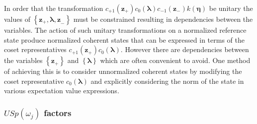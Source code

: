 \documentclass[aps,preprint]{revtex4}%
\begin{document}
In order that the transformation $c_{+1}\left(  \mathbf{z}_{+}\right)
c_{0}\left(  \mathbf{\lambda}\right)  c_{-1}\left(  \mathbf{z}_{-}\right)
k\left(  \mathbf{\eta}\right)  $ be unitary the values of $\left\{
\mathbf{z}_{+},\mathbf{\lambda,z}_{-}\right\}  $ must be constrained resulting
in dependencies between the variables. The action of such unitary
transformations on a normalized reference state produce normalized coherent
states that can be expressed in terms of the coset representatives
$c_{+1}\left(  \mathbf{z}_{+}\right)  c_{0}\left(  \mathbf{\lambda}\right)  $.
However there are dependencies between the variables $\left\{  \mathbf{z}%
_{+}\right\}  $ and $\left\{  \mathbf{\lambda}\right\}  $ which are often
convenient to avoid. One method of achieving this is to consider unnormalized
coherent states by modifying the coset representative $c_{0}\left(
\mathbf{\lambda}\right)  $ and explicitly considering the norm of the state in
various expectation value expressions.

\subsubsection{$USp\left(  \omega_{j}\right)  $ factors}
\end{document}
